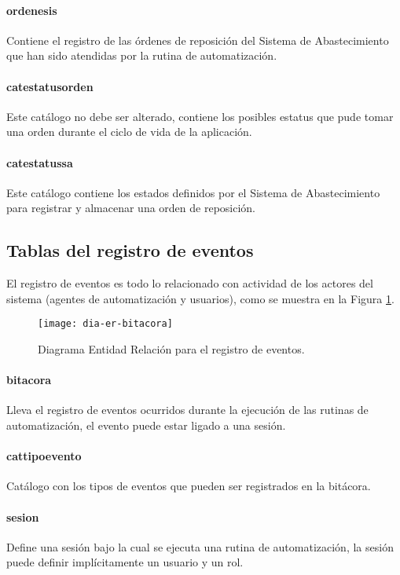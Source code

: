 \paragraph{ordenes{\textunderscore}is\\} Contiene el registro de las órdenes de reposición del Sistema de Abastecimiento que han sido atendidas por la rutina de automatización.
\paragraph{cat{\textunderscore}estatus{\textunderscore}orden\\} Este catálogo no debe ser alterado, contiene los posibles estatus que pude tomar una orden durante el ciclo de vida de la aplicación.
\paragraph{cat{\textunderscore}estatus{\textunderscore}sa\\} Este catálogo contiene los estados definidos por el Sistema de Abastecimiento para registrar y almacenar una orden de reposición.


\subsection{Tablas del registro de eventos}
El registro de eventos es todo lo relacionado con actividad de los actores del sistema (agentes de automatización y usuarios), como se muestra en la Figura \ref{fig:dia-er-bitacora}.
\begin{figure}[h]
  \centering
  \texttt{[image: dia-er-bitacora]} 
  \caption{Diagrama Entidad Relación para el registro de eventos.}
  \label{fig:dia-er-bitacora}
\end{figure}
\paragraph{bitacora\\} Lleva el registro de eventos ocurridos durante la ejecución de las rutinas de automatización, el evento puede estar ligado a una sesión.
\paragraph{cat{\textunderscore}tipo{\textunderscore}evento\\} Catálogo con los tipos de eventos que pueden ser registrados en la bitácora.
\paragraph{sesion\\} Define una sesión bajo la cual se ejecuta una rutina de automatización, la sesión puede definir implícitamente un usuario y un rol.


